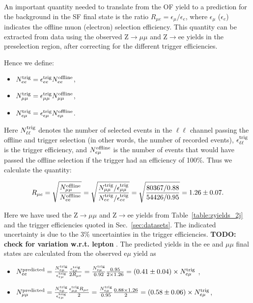 An important quantity needed to translate from the OF yield to a prediction for the background in the SF final state is the ratio 
$R_{\mu e} = \epsilon_\mu / \epsilon_e$, where $\epsilon_\mu$ ($\epsilon_e$) indicates the offline muon (electron) selection efficiency. 
This quantity can be extracted from data using the observed Z$\to\mu\mu$ and Z$\to$ee yields in the preselection region, after correcting 
for the different trigger efficiencies.

Hence we define:

\begin{itemize}
\item $N_{ee}^{\rm{trig}} = \epsilon_{ee}^{\rm{trig}}N_{ee}^{\rm{offline}}$,
\item $N_{\mu\mu}^{\rm{trig}} = \epsilon_{\mu\mu}^{\rm{trig}}N_{\mu\mu}^{\rm{offline}}$,
\item $N_{e\mu}^{\rm{trig}} = \epsilon_{e\mu}^{\rm{trig}}N_{e\mu}^{\rm{offline}}$.
\end{itemize}
 
Here $N_{\ell\ell}^{\rm{trig}}$ denotes the number of selected events in the $\ell\ell$ channel passing the offline and trigger selection
(in other words, the number of recorded events), $\epsilon_{\ell\ell}^{\rm{trig}}$ is the trigger efficiency, and 
$N_{e\mu}^{\rm{offline}}$ is the number of events that would have passed the offline selection if the trigger had an efficiency of 100\%.
Thus we calculate the quantity:

\begin{equation}
R_{\mu e} = \sqrt{\frac{N_{\mu\mu}^{\rm{offline}}}{N_{ee}^{\rm{offline}}}} = \sqrt{\frac{N_{\mu\mu}^{\rm{trig}}/\epsilon_{\mu\mu}^{\rm{trig}}}{N_{ee}^{\rm{trig}}/\epsilon_{ee}^{\rm{trig}}}} 
= \sqrt{\frac{80367/0.88}{54426/0.95}} = 1.26\pm0.07.
\end{equation}

Here we have used the Z$\to\mu\mu$ and Z$\to$ee yields from Table~\ref{table:zyields_2j} and the trigger efficiencies quoted in Sec.~\ref{sec:datasets}.
The indicated uncertainty is due to the 3\% uncertainties in the trigger efficiencies. {\bf TODO: check for variation w.r.t. lepton \pt}.
The predicted yields in the ee and $\mu\mu$ final states are calculated from the observed e$\mu$ yield as

\begin{itemize}
\item $N_{ee}^{\rm{predicted}}    = \frac {N_{e\mu}^{\rm{trig}}} {\epsilon_{e\mu}^{\rm{trig}}} \frac {\epsilon_{ee}^{\rm{trig}}} {2 R_{\mu e}} 
= \frac{N_{e\mu}^{\rm{trig}}}{0.92}\frac{0.95}{2\times1.26} = (0.41\pm0.04) \times N_{e\mu}^{\rm{trig}}$ ,
\item $N_{\mu\mu}^{\rm{predicted}} = \frac {N_{e\mu}^{\rm{trig}}} {\epsilon_{e\mu}^{\rm{trig}}} \frac {\epsilon_{\mu\mu}^{\rm{trig}} R_{\mu e}}  {2}
= \frac {N_{e\mu}^{\rm{trig}}} {0.95} \frac {0.88 \times 1.26}{2} = (0.58\pm0.06) \times N_{e\mu}^{\rm{trig}}$,
\end{itemize}

